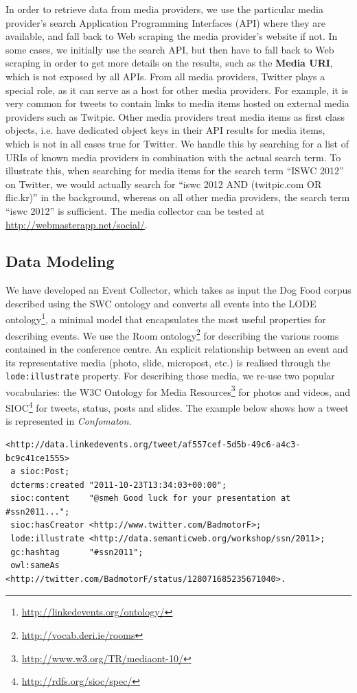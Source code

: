 In order to retrieve data from media providers, we use the particular media provider's search Application Programming Interfaces (API) where they are available, and fall back to Web scraping the media provider's website if not. In some cases, we initially use the search API, but then have to fall back to Web scraping in order to get more details on the results, such as the \textbf{Media URI}, which is not exposed by all APIs. From all media providers, Twitter plays a special role, as it can serve as a host for other media providers. For example, it is very common for tweets to contain links to media items hosted on external media providers such as Twitpic. Other media providers treat media items as first class objects, i.e. have dedicated object keys in their API results for media items, which is not in all cases true for Twitter. We handle this by searching for a list of URIs of known media providers in combination with the actual search term. To illustrate this, when searching for media items for the search term ``ISWC 2012'' on Twitter, we would actually search for ``iswc 2012 AND (twitpic.com OR flic.kr)'' in the background, whereas on all other media providers, the search term ``iswc 2012'' is sufficient. The media collector can be tested at \url{http://webmasterapp.net/social/}.

\subsection{Data Modeling}
We have developed an Event Collector, which takes as input the Dog Food corpus described using the SWC ontology and converts all events into the LODE ontology\footnote{\url{http://linkedevents.org/ontology/}}, a minimal model that encapsulates the most useful properties for describing events. We use the Room ontology\footnote{\url{http://vocab.deri.ie/rooms}} for describing the various rooms contained in the conference centre. An explicit relationship between an event and its representative media (photo, slide, micropost, etc.) is realised through the \texttt{lode:illustrate} property. For describing those media, we re-use two popular vocabularies: the W3C Ontology for Media Resources\footnote{\url{http://www.w3.org/TR/mediaont-10/}} for photos and videos, and SIOC\footnote{\url{http://rdfs.org/sioc/spec/}} for tweets, status, posts and slides. The example below shows how a tweet is represented in \emph{Confomaton}.
{\footnotesize 	
\begin{verbatim}
<http://data.linkedevents.org/tweet/af557cef-5d5b-49c6-a4c3-bc9c41ce1555>
 a sioc:Post;
 dcterms:created "2011-10-23T13:34:03+00:00";
 sioc:content    "@smeh Good luck for your presentation at #ssn2011...";
 sioc:hasCreator <http://www.twitter.com/BadmotorF>;
 lode:illustrate <http://data.semanticweb.org/workshop/ssn/2011>;
 gc:hashtag      "#ssn2011";
 owl:sameAs      <http://twitter.com/BadmotorF/status/128071685235671040>.
\end{verbatim}
}

